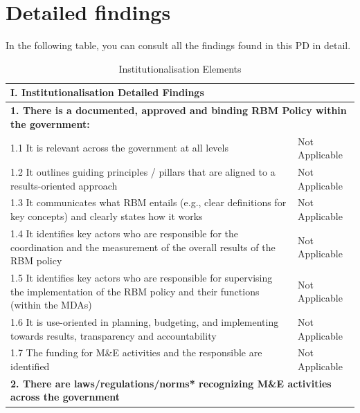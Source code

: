 \documentclass[
  10pt,
]{book}
\begin{document}
\hypertarget{appendixB}{%
\chapter{Detailed findings}\label{appendixB}}

In the following table, you can consult all the findings found in this PD in detail.

\begin{table}

\caption{\label{tab:unnamed-chunk-2}Institutionalisation Elements}
\centering
\begin{tabular}[t]{l|l}
\hline
I. Institutionalisation Detailed Findings &  \\
\hline
\multicolumn{2}{l}{\textbf{1. There is a documented, approved and binding RBM Policy within the government:}}\\
\hline
\hspace{1em}1.1 It is relevant across the government at all levels & Not Applicable\\
\hline
\hspace{1em}1.2 It outlines guiding principles / pillars that are aligned to a results-oriented approach & Not Applicable\\
\hline
\hspace{1em}1.3 It communicates what RBM entails (e.g., clear definitions for key concepts) and clearly states how it works & Not Applicable\\
\hline
\hspace{1em}1.4 It identifies key actors who are responsible for the coordination and the measurement of the overall results of the RBM policy & Not Applicable\\
\hline
\hspace{1em}1.5 It identifies key actors who are responsible for supervising the implementation of the RBM policy and their functions (within the MDAs) & Not Applicable\\
\hline
\hspace{1em}1.6 It is use-oriented in planning, budgeting, and implementing towards results, transparency and accountability & Not Applicable\\
\hline
\hspace{1em}1.7 The funding for M\&E activities and the responsible are identified & Not Applicable\\
\hline
\multicolumn{2}{l}{\textbf{2. There are laws/regulations/norms* recognizing M\&E activities across the government}}\\
\hline

\end{tabular}
\end{table}
\end{document}

